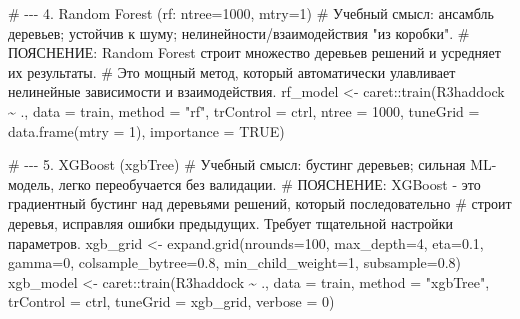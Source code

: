 \documentclass[
  letterpaper,
  DIV=11,
  numbers=noendperiod]{scrreprt}
\newenvironment{Shaded}{\begin{snugshade}}{\end{snugshade}}
\newcommand{\AttributeTok}[1]{\textcolor[rgb]{0.40,0.45,0.13}{#1}}
\newcommand{\CommentTok}[1]{\textcolor[rgb]{0.37,0.37,0.37}{#1}}
\newcommand{\ConstantTok}[1]{\textcolor[rgb]{0.56,0.35,0.01}{#1}}
\newcommand{\DecValTok}[1]{\textcolor[rgb]{0.68,0.00,0.00}{#1}}
\newcommand{\FloatTok}[1]{\textcolor[rgb]{0.68,0.00,0.00}{#1}}
\newcommand{\FunctionTok}[1]{\textcolor[rgb]{0.28,0.35,0.67}{#1}}
\newcommand{\NormalTok}[1]{\textcolor[rgb]{0.00,0.23,0.31}{#1}}
\newcommand{\OtherTok}[1]{\textcolor[rgb]{0.00,0.23,0.31}{#1}}
\newcommand{\SpecialCharTok}[1]{\textcolor[rgb]{0.37,0.37,0.37}{#1}}
\newcommand{\StringTok}[1]{\textcolor[rgb]{0.13,0.47,0.30}{#1}}
\begin{document}
\begin{Shaded}
\begin{Highlighting}[]
\CommentTok{\# {-}{-}{-} 4. Random Forest (rf: ntree=1000, mtry=1)}
\CommentTok{\# Учебный смысл: ансамбль деревьев; устойчив к шуму; нелинейности/взаимодействия "из коробки".}
\CommentTok{\# ПОЯСНЕНИЕ: Random Forest строит множество деревьев решений и усредняет их результаты.}
\CommentTok{\# Это мощный метод, который автоматически улавливает нелинейные зависимости и взаимодействия. }
\NormalTok{rf\_model    }\OtherTok{\textless{}{-}}\NormalTok{ caret}\SpecialCharTok{::}\FunctionTok{train}\NormalTok{(R3haddock }\SpecialCharTok{\textasciitilde{}}\NormalTok{ ., }\AttributeTok{data =}\NormalTok{ train, }\AttributeTok{method =} \StringTok{"rf"}\NormalTok{, }\AttributeTok{trControl =}\NormalTok{ ctrl,}
                            \AttributeTok{ntree =} \DecValTok{1000}\NormalTok{, }\AttributeTok{tuneGrid =} \FunctionTok{data.frame}\NormalTok{(}\AttributeTok{mtry =} \DecValTok{1}\NormalTok{), }\AttributeTok{importance =} \ConstantTok{TRUE}\NormalTok{)}

\CommentTok{\# {-}{-}{-} 5. XGBoost (xgbTree) }
\CommentTok{\# Учебный смысл: бустинг деревьев; сильная ML{-}модель, легко переобучается без валидации.}
\CommentTok{\# ПОЯСНЕНИЕ: XGBoost {-} это градиентный бустинг над деревьями решений, который последовательно }
\CommentTok{\# строит деревья, исправляя ошибки предыдущих. Требует тщательной настройки параметров.}
\NormalTok{xgb\_grid    }\OtherTok{\textless{}{-}} \FunctionTok{expand.grid}\NormalTok{(}\AttributeTok{nrounds=}\DecValTok{100}\NormalTok{, }\AttributeTok{max\_depth=}\DecValTok{4}\NormalTok{, }\AttributeTok{eta=}\FloatTok{0.1}\NormalTok{, }\AttributeTok{gamma=}\DecValTok{0}\NormalTok{,}
                           \AttributeTok{colsample\_bytree=}\FloatTok{0.8}\NormalTok{, }\AttributeTok{min\_child\_weight=}\DecValTok{1}\NormalTok{, }\AttributeTok{subsample=}\FloatTok{0.8}\NormalTok{)}
\NormalTok{xgb\_model   }\OtherTok{\textless{}{-}}\NormalTok{ caret}\SpecialCharTok{::}\FunctionTok{train}\NormalTok{(R3haddock }\SpecialCharTok{\textasciitilde{}}\NormalTok{ ., }\AttributeTok{data =}\NormalTok{ train, }\AttributeTok{method =} \StringTok{"xgbTree"}\NormalTok{,}
                            \AttributeTok{trControl =}\NormalTok{ ctrl, }\AttributeTok{tuneGrid =}\NormalTok{ xgb\_grid, }\AttributeTok{verbose =} \DecValTok{0}\NormalTok{)}


\end{Highlighting}
\end{Shaded}
\end{document}
